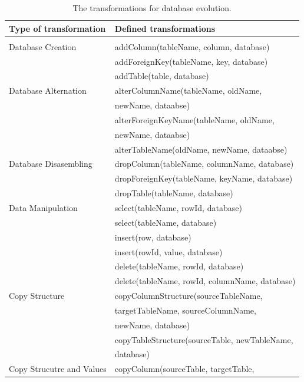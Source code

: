 \documentclass[runningheads]{comsis}
\begin{document}
\begin{table}
\caption{The transformations for database evolution.}
	\label{tab:db-basic-evolution}
\centering
\setlength\tabcolsep{0.5em}
	\begin{tabular}{ll}
	\hline
	Type of transformation & Defined transformations \\
	\hline
	\\[-2ex] Database Creation
	& addColumn(tableName, column, database) \\
	& addForeignKey(tableName, key, database) \\
	& addTable(table, database)\\
	Database Alternation
	& alterColumnName(tableName, oldName, \\ & \hspace{0.5in}newName, dataabse) \\
	& alterForeignKeyName(tableName, oldName, \\ & \hspace{0.5in}newName, dataabse) \\
	& alterTableName(oldName, newName, dataabse) \\
	Database Disasembling
	& dropColumn(tableName, columnName, database) \\
	& dropForeignKey(tableName, keyName, database) \\
	& dropTable(tableName, database) \\
	Data Manipulation
	& select(tableName, rowId, database) \\
	& select(tableName, database) \\
	& insert(row, database) \\
	& insert(rowId, value, database) \\
	& delete(tableName, rowId, database) \\
	& delete(tableName, rowId, columnName, database) \\
	Copy Structure
	& copyColumnStructure(sourceTableName,\\ &  \hspace{0.5in} targetTableName,  sourceColumnName, \\ &  \hspace{0.5in} newName, database) \\
	& copyTableStructure(sourceTable, newTableName, \\ &  \hspace{0.5in} database) \\
	Copy Strucutre and Values
	& copyColumn(sourceTable, targetTable, \\

\end{tabular}
\end{table}
\end{document}
